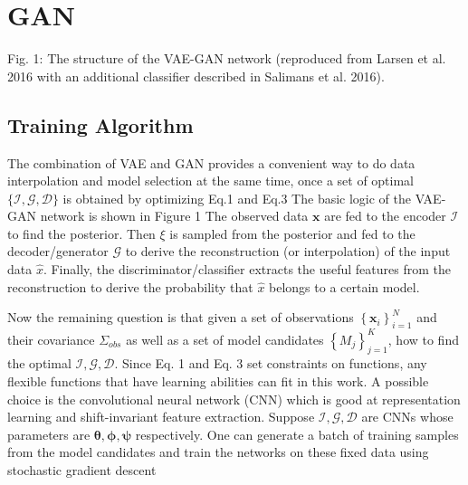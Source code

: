 \documentclass[10pt]{article}
\begin{document}
\section{GAN}
Fig. 1: The structure of the VAE-GAN network (reproduced from Larsen et al. 2016 with an additional classifier described in Salimans et al. 2016).

\subsection{Training Algorithm}
The combination of VAE and GAN provides a convenient way to do data interpolation and model selection at the same time, once a set of optimal $\{\mathcal{I}, \mathcal{G}, \mathcal{D}\}$ is obtained by optimizing Eq.1 and Eq.3 The basic logic of the VAE-GAN network is shown in Figure 1 The observed data $\boldsymbol{x}$ are fed to the encoder $\mathcal{I}$ to find the posterior. Then $\xi$ is sampled from the posterior and fed to the decoder/generator $\mathcal{G}$ to derive the reconstruction (or interpolation) of the input data $\hat{x}$. Finally, the discriminator/classifier extracts the useful features from the reconstruction to derive the probability that $\hat{x}$ belongs to a certain model.

Now the remaining question is that given a set of observations $\left\{\boldsymbol{x}_{i}\right\}_{i=1}^{N}$ and their covariance $\Sigma_{o b s}$ as well as a set of model candidates $\left\{M_{j}\right\}_{j=1}^{K}$, how to find the optimal $\mathcal{I}, \mathcal{G}, \mathcal{D}$. Since Eq. 1 and Eq. 3 set constraints on functions, any flexible functions that have learning abilities can fit in this work. A possible choice is the convolutional neural network (CNN) which is good at representation learning and shift-invariant feature extraction. Suppose $\mathcal{I}, \mathcal{G}, \mathcal{D}$ are CNNs whose parameters are $\boldsymbol{\theta}, \boldsymbol{\phi}, \boldsymbol{\psi}$ respectively. One can generate a batch of training samples from the model candidates and train the networks on these fixed data using stochastic gradient descent
\end{document}
